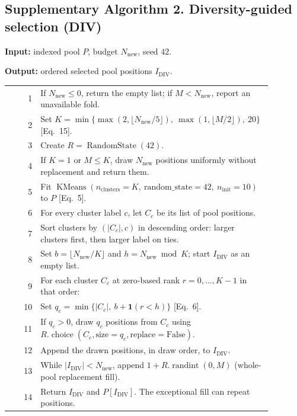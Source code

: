 \subsection*{Supplementary Algorithm 2. Diversity-guided selection (DIV)}
\noindent\textbf{Input:} indexed pool $P$, budget $N_{\mathrm{new}}$, seed $42$.\par
\noindent\textbf{Output:} ordered selected pool positions $I_{\mathrm{DIV}}$.\par\smallskip
\noindent\begin{tabular}{@{}r@{\hspace{1em}}p{0.88\linewidth}@{}}
1 & If $N_{\mathrm{new}}\leq0$, return the empty list; if $M<N_{\mathrm{new}}$, report an unavailable fold.\\[2pt]
2 & Set $K=\min\{\max(2,\lfloor N_{\mathrm{new}}/5\rfloor),\ \max(1,\lfloor M/2\rfloor),\ 20\}$ [Eq.~15].\\[2pt]
3 & Create $R=\operatorname{RandomState}(42)$.\\[2pt]
4 & If $K=1$ or $M\leq K$, draw $N_{\mathrm{new}}$ positions uniformly without replacement and return them.\\[2pt]
5 & Fit $\operatorname{KMeans}(n_{\mathrm{clusters}}=K,\ \mathrm{random\_state}=42,\ n_{\mathrm{init}}=10)$ to $P$ [Eq.~5].\\[2pt]
6 & For every cluster label $c$, let $C_c$ be its list of pool positions.\\[2pt]
7 & Sort clusters by $(|C_c|,c)$ in descending order: larger clusters first, then larger label on ties.\\[2pt]
8 & Set $b=\lfloor N_{\mathrm{new}}/K\rfloor$ and $h=N_{\mathrm{new}}\bmod K$; start $I_{\mathrm{DIV}}$ as an empty list.\\[2pt]
9 & For each cluster $C_c$ at zero-based rank $r=0,\ldots,K-1$ in that order:\\[2pt]
10 & \quad Set $q_c=\min\{|C_c|,\ b+\mathbf{1}(r<h)\}$ [Eq.~6].\\[2pt]
11 & \quad If $q_c>0$, draw $q_c$ positions from $C_c$ using $R.\operatorname{choice}(C_c,\mathrm{size}=q_c,\mathrm{replace}=\mathrm{False})$.\\[2pt]
12 & \quad Append the drawn positions, in draw order, to $I_{\mathrm{DIV}}$.\\[2pt]
13 & While $|I_{\mathrm{DIV}}|<N_{\mathrm{new}}$, append $1+R.\operatorname{randint}(0,M)$ (whole-pool replacement fill).\\[2pt]
14 & Return $I_{\mathrm{DIV}}$ and $P[I_{\mathrm{DIV}}]$. The exceptional fill can repeat positions.\\
\end{tabular}

